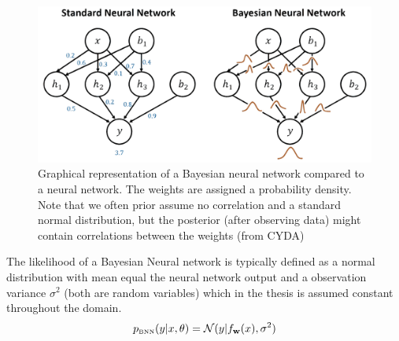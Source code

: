 \begin{figure}
    \centering
    \includegraphics[width=\textwidth]{Pictures/BNN_illustration.pdf}
    \caption{Graphical representation of a Bayesian neural network compared to a neural network. The
    weights are assigned a probability density. Note that we often prior assume no correlation and
    a standard normal distribution, but the posterior (after observing data) might contain
    correlations between the weights (from CYDA)}
    \label{BNN_illustration2}
\end{figure}

The likelihood of a Bayesian Neural network is typically defined as a normal distribution with mean
equal the neural network output and a observation variance $\sigma^2$ (both are random variables) which in the
thesis is assumed constant throughout the domain.  
$$p_{\text{\tiny BNN}}(y|x, \theta) = \mathcal{N}(y|f_{\textbf{w}}(x),\sigma^2)$$


